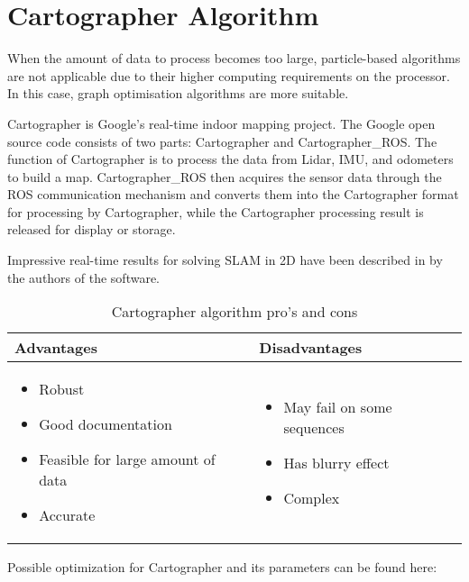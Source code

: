 \documentclass[12pt, a4paper, onecolumn]{article}
\begin{document}
\section{Cartographer Algorithm}
When the amount of data to process becomes too large, particle-based algorithms are not applicable due to their higher computing requirements on the processor. In this case, graph optimisation algorithms are more suitable.\cite{2DSLAM20}\par
Cartographer is Google's real-time indoor mapping project. The Google open source code consists of two parts: Cartographer and Cartographer{\_}ROS. The function of Cartographer is to process the data from Lidar, IMU, and odometers to build a map. Cartographer{\_}ROS then acquires the sensor data through the ROS communication mechanism and converts them into the Cartographer format for processing by Cartographer, while the Cartographer processing result is released for display or storage. \cite{2DSLAM20} \par
Impressive real-time results for solving SLAM in 2D have been described in \cite{CARTO16} by the authors of the software.
\begin{table}[h!]
\centering
\begin{tabular}{ |p{}||p{}|  }
 \hline
 Advantages&Disadvantages\\
 \hline
\begin{itemize}
  \item Robust
  \item Good documentation
  \item Feasible for large amount of data
  \item Accurate \cite{SLAMQuality}
  \end{itemize} 
  & 
  \begin{itemize}
  \item May fail on some sequences \cite{SLAMQuality}
  \item Has blurry effect \cite{SLAMQuality}
  \item Complex
  \end{itemize} \\

 \hline
\end{tabular}
\caption{Cartographer algorithm pro's and cons }
\label{table:1}
\end{table}

Possible optimization for Cartographer and its parameters can be found here: \cite{CARTO19}
\end{document}
